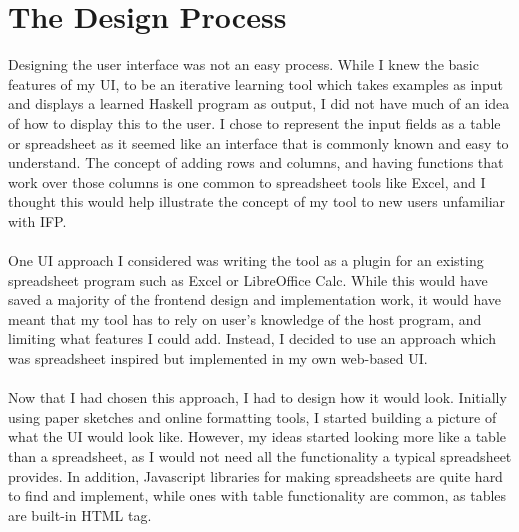 \section{The Design Process}
Designing the user interface was not an easy process. While I knew the basic features of my UI, to be an iterative learning tool which takes examples as input and displays a learned Haskell program as output, I did not have much of an idea of how to display this to the user. I chose to represent the input fields as a table or spreadsheet as it seemed like an interface that is commonly known and easy to understand. The concept of adding rows and columns, and having functions that work over those columns is one common to spreadsheet tools like Excel, and I thought this would help illustrate the concept of my tool to new users unfamiliar with IFP. \\ \\
One UI approach I considered was writing the tool as a plugin for an existing spreadsheet program such as Excel or LibreOffice Calc. While this would have saved a majority of the frontend design and implementation work, it would have meant that my tool has to rely on user's knowledge of the host program, and limiting what features I could add. Instead, I decided to use an approach which was spreadsheet inspired but implemented in my own web-based UI.\\ \\
Now that I had chosen this approach, I had to design how it would look. Initially using paper sketches and online formatting tools, I started building a picture of what the UI would look like. However, my ideas started looking more like a table than a spreadsheet, as I would not need all the functionality a typical spreadsheet provides. In addition, Javascript libraries for making spreadsheets are quite hard to find and implement, while ones with table functionality are common, as tables are built-in HTML tag.

